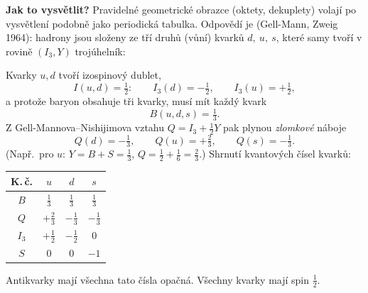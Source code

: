 \textbf{Jak to vysvětlit?} Pravidelné geometrické obrazce (oktety,
dekuplety) volají po vysvětlení podobně jako periodická tabulka. Odpovědí
je  (Gell-Mann, Zweig 1964): hadrony jsou složeny ze tří
druhů (vůní) kvarků \(d,\ u,\ s\), které samy tvoří v rovině \((I_3,Y)\)
trojúhelník:
\begin{center}
\end{center}
Kvarky \(u,d\) tvoří izospinový dublet,
\[
  I(u,d)=\tfrac12:\qquad I_3(d)=-\tfrac12,\qquad I_3(u)=+\tfrac12,
\]
a protože baryon obsahuje tři kvarky, musí mít každý kvark
\[ B(u,d,s)=\tfrac13 . \]
Z Gell-Mannova--Nishijimova vztahu \(Q=I_3+\tfrac12Y\) pak plynou
\emph{zlomkové} náboje
\[
  Q(d)=-\tfrac13,\qquad Q(u)=+\tfrac23,\qquad Q(s)=-\tfrac13 .
\]
(Např.\ pro \(u\): \(Y=B+S=\tfrac13\), \(Q=\tfrac12+\tfrac16=\tfrac23\).)
Shrnutí kvantových čísel kvarků:
\begin{center}
\begin{tabular}{c|ccc}
  K.\,č. & \(u\) & \(d\) & \(s\)\\ \hline
  \(B\)   & \(\tfrac13\) & \(\tfrac13\) & \(\tfrac13\)\\[2pt]
  \(Q\)   & \(+\tfrac23\) & \(-\tfrac13\) & \(-\tfrac13\)\\[2pt]
  \(I_3\) & \(+\tfrac12\) & \(-\tfrac12\) & \(0\)\\[2pt]
  \(S\)   & \(0\) & \(0\) & \(-1\)
\end{tabular}
\end{center}
Antikvarky mají všechna tato čísla opačná. Všechny kvarky mají spin
\(\tfrac12\).

